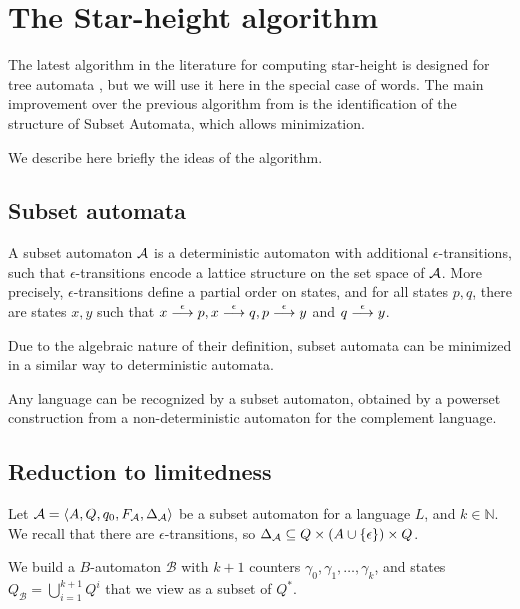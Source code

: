 \newcommand{\cB}{\mathcal B}

\section{The Star-height algorithm}

The latest algorithm in the literature for computing star-height is designed for tree automata \cite{CL08sh}, but we will use it here in the special case of words. The main improvement over the previous algorithm from \cite{Kirsten05} is the identification of the structure of Subset Automata, which allows minimization.

We describe here briefly the ideas of the algorithm.

\subsection{Subset automata}

\begin{definition}\cite{CL08sh}
A subset automaton $\mathcal{A}$ is a deterministic automaton with additional $\epsilon$-transitions, such that $\epsilon$-transitions encode a lattice structure on the set space of $\mathcal{A}$. More precisely, $\epsilon$-transitions define a partial order on states, and for all states $p,q$, there are states $x,y$ such that $x\stackrel{\epsilon}{\longrightarrow}p, x\stackrel{\epsilon}{\longrightarrow}q, p\stackrel{\epsilon}{\longrightarrow}y$ and $q\stackrel{\epsilon}{\longrightarrow}y$.
\end{definition}

Due to the algebraic nature of their definition, subset automata can be minimized in a similar way to deterministic automata.

\begin{theorem}\cite{CL08sh}
Any language can be recognized by a subset automaton, obtained by a powerset construction from a non-deterministic automaton for the complement language.
\end{theorem}

\subsection{Reduction to limitedness}

Let $\mathcal{A}=\langle A,Q,q_0,F_{\mathcal{A}},\Delta_{\mathcal{A}} \rangle$ be a subset automaton for a language $L$, and $k\in \mathbb N$. We recall that there are $\epsilon$-transitions, so $\Delta_{\mathcal{A}}\subseteq Q\times (A\cup\{\epsilon\})\times Q$.

We build a $B$-automaton $\cB$ with $k+1$ counters $\gamma_0,\gamma_1,\dots,\gamma_k$, and states $Q_\cB=\bigcup_{i=1}^{k+1} Q^i$ that we view as a subset of $Q^*$.

